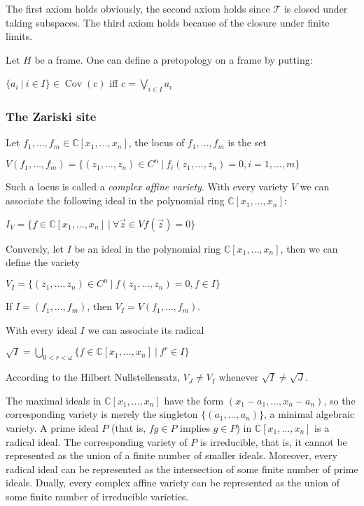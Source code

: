 \documentclass[a4paper]{article}
\theoremstyle{defin}
\theoremstyle{theorem}
\theoremstyle{claim}
\theoremstyle{prop}
\theoremstyle{lemma}
\theoremstyle{fact}
\theoremstyle{ex}
\theoremstyle{col}
\begin{document}
The first axiom holds obviously, the second axiom holds since $\mathcal{T}$ is closed under taking subspaces. The third axiom holds because of the closure under finite limits.

Let $H$ be a frame. One can define a pretopology on a frame by putting:
\begin{center}
$\{ a_i \: | \: i \in I \} \in \operatorname{Cov}(c)$ iff $c = \bigvee \limits_{i \in I} a_i$
\end{center}

\subsubsection{The Zariski site}

Let $f_1, \dots, f_m \in \mathbb{C}[x_1, \dots, x_n]$, the locus of $f_1, \dots, f_m$ is the set
\begin{center}
$V(f_1, \dots, f_m) = \{ (z_1, \dots, z_n) \in C^n \: | \: f_i(z_1, \dots, z_n) = 0, i = 1, \dots, m \}$
\end{center}
Such a locus is called a \emph{complex affine variety}. With every variety $V$ we can associate the following ideal in the polynomial ring $\mathbb{C}[x_1, \dots, x_n]$:
\begin{center}
$I_V = \{ f \in \mathbb{C}[x_1, \dots, x_n] \: | \: \forall \vec{z} \in V f(\vec{z}) = 0 \}$
\end{center}
Conversly, let $I$ be an ideal in the polynomial ring $\mathbb{C}[x_1, \dots, x_n]$, then we can define the variety
\begin{center}
$V_I = \{ (z_1, \dots, z_n) \in C^n \: | \: f(z_1, \dots, z_n) = 0, f \in I \} $
\end{center}
If $I = (f_1, \dots, f_m)$, then $V_I = V(f_1, \dots, f_m)$.

With every ideal $I$ we can associate its radical
\begin{center}
$\sqrt{I} = \bigcup \limits_{0 < r < \omega} \{ f \in \mathbb{C}[x_1, \dots, x_n] \: | \: f^r \in I \}$
\end{center}
According to the Hilbert Nullstellensatz, $V_J \neq V_I$ whenever $\sqrt{I} \neq \sqrt{J}$.

The maximal ideals in $\mathbb{C}[x_1, \dots, x_n]$ have the form $(x_1 - a_1, \dots, x_n - a_n)$, so the corresponding variety is merely the singleton $\{ (a_1, \dots, a_n) \}$, a minimal algebraic variety. A prime ideal $P$ (that is, $fg \in P$ implies $g \in P$) in $\mathbb{C}[x_1, \dots, x_n]$ is a radical ideal. The corresponding variety of $P$ is irreducible, that is, it cannot be represented as the union of a finite number of smaller ideals. Moreover, every radical ideal can be represented as the intersection of some finite number of prime ideals. Dually, every complex affine variety can be represented as the union of some finite number of irreducible varieties.
\end{document}

